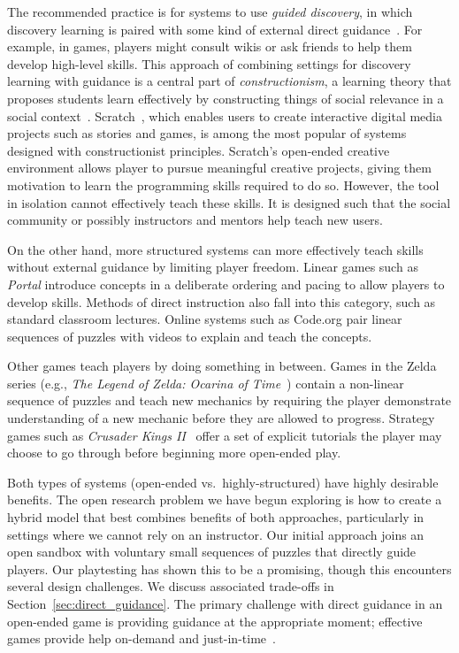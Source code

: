 \documentclass{sig-alternate}
\begin{document}
The recommended practice is for systems to use \emph{guided discovery}, in which discovery learning is paired with some kind of external direct guidance~\cite{mayer2004should}.  For example, in games, players might consult wikis or ask friends to help them develop high-level skills.
This approach of combining settings for discovery learning with guidance is a central part of \emph{constructionism}, a learning theory that proposes students learn effectively by constructing things of social relevance in a social context~\cite{kafai06constructionism}.
Scratch~\cite{maloney2010scratch}, which enables users to create interactive digital media projects such as stories and games, is among the most popular of systems designed with constructionist principles.
Scratch's open-ended creative environment allows player to pursue meaningful creative projects, giving them motivation to learn the programming skills required to do so.
However, the tool in isolation cannot effectively teach these skills.
It is designed such that the social community or possibly instructors and mentors help teach new users.

On the other hand, more structured systems can more effectively teach skills without external guidance by limiting player freedom.
Linear games such as \emph{Portal} introduce concepts in a deliberate ordering and pacing to allow players to develop skills.
Methods of direct instruction also fall into this category, such as standard classroom lectures.
Online systems such as Code.org pair linear sequences of puzzles with videos to explain and teach the concepts.

Other games teach players by doing something in between. 
Games in the Zelda series (e.g., \emph{The Legend of Zelda: Ocarina of Time}~\cite{zelda_oot}) contain a non-linear sequence of puzzles and teach new mechanics by requiring the player demonstrate understanding of a new mechanic before they are allowed to progress. 
Strategy games such as \emph{Crusader Kings II}~\cite{ck2} offer a set of explicit tutorials the player may choose to go through before beginning more open-ended play.

Both types of systems (open-ended vs.\ highly-structured) have highly desirable benefits.
The open research problem we have begun exploring is how to create a hybrid model that best combines benefits of both approaches, particularly in settings where we cannot rely on an instructor.
Our initial approach joins an open sandbox with voluntary small sequences of puzzles that directly guide players.
Our playtesting has shown this to be a promising, though this encounters several design challenges. We discuss associated trade-offs in Section~\ref{sec:direct_guidance}.
The primary challenge with direct guidance in an open-ended game is providing guidance at the appropriate moment;
effective games provide help on-demand and just-in-time~\cite{gee2003video}.
\end{document}

